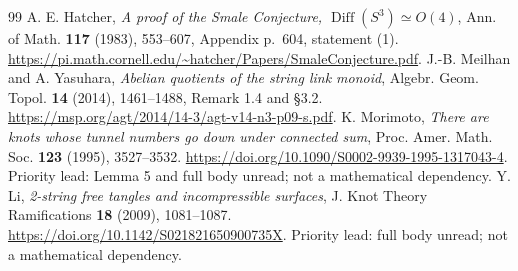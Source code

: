 \documentclass[11pt]{article}
\theoremstyle{remark}\newtheorem{remark}[theorem]{Remark}
\newcommand{\Diff}{\operatorname{Diff}}
\begin{document}
\begin{thebibliography}{99}
 A. E. Hatcher, \emph{A proof of the Smale Conjecture,
$\Diff(S^3)\simeq O(4)$}, Ann. of Math. \textbf{117} (1983), 553--607,
Appendix p.~604, statement (1).
\url{https://pi.math.cornell.edu/~hatcher/Papers/SmaleConjecture.pdf}.
 J.-B. Meilhan and A. Yasuhara, \emph{Abelian quotients of
the string link monoid}, Algebr. Geom. Topol. \textbf{14} (2014),
1461--1488, Remark 1.4 and \S3.2.
\url{https://msp.org/agt/2014/14-3/agt-v14-n3-p09-s.pdf}.
 K. Morimoto, \emph{There are knots whose tunnel numbers
go down under connected sum}, Proc. Amer. Math. Soc. \textbf{123} (1995),
3527--3532. \url{https://doi.org/10.1090/S0002-9939-1995-1317043-4}.
Priority lead: Lemma 5 and full body unread; not a mathematical dependency.
 Y. Li, \emph{2-string free tangles and incompressible surfaces},
J. Knot Theory Ramifications \textbf{18} (2009), 1081--1087.
\url{https://doi.org/10.1142/S021821650900735X}.
Priority lead: full body unread; not a mathematical dependency.
\end{thebibliography}
\end{document}

